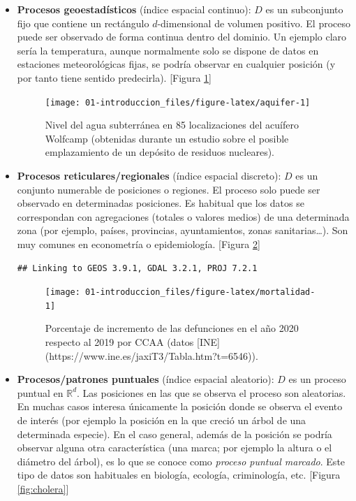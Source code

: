 \documentclass[
  spanish,
]{book}
\theoremstyle{break}
\theoremstyle{definition}
\theoremstyle{definition}
\theoremstyle{definition}
\theoremstyle{definition}
\theoremstyle{remark}
\begin{document}
\begin{itemize}
\item
  \textbf{Procesos geoestadísticos} (índice espacial continuo):
  \(D\) es un subconjunto fijo que contiene un rectángulo \(d\)-dimensional de volumen
  positivo. El proceso puede ser observado de forma continua dentro del dominio.
  Un ejemplo claro sería la temperatura, aunque normalmente solo se dispone de datos en
  estaciones meteorológicas fijas, se podría observar en cualquier posición
  (y por tanto tiene sentido predecirla). {[}Figura \ref{fig:aquifer}{]}

  \begin{figure}[!htb]

  {\centering \texttt{[image: 01-introduccion\_files/figure-latex/aquifer-1]} 

  }

  \caption{Nivel del agua subterránea en 85 localizaciones del acuífero Wolfcamp (obtenidas durante un estudio sobre el posible emplazamiento de un depósito de residuos nucleares).}\label{fig:aquifer}
  \end{figure}
\item
  \textbf{Procesos reticulares/regionales} (índice espacial discreto):
  \(D\) es un conjunto numerable de posiciones o regiones. El proceso solo puede ser
  observado en determinadas posiciones. Es habitual que los datos se correspondan
  con agregaciones (totales o valores medios) de una determinada zona (por ejemplo,
  países, provincias, ayuntamientos, zonas sanitarias\ldots). Son muy comunes en
  econometría o epidemiología. {[}Figura \ref{fig:mortalidad}{]}

\begin{verbatim}
## Linking to GEOS 3.9.1, GDAL 3.2.1, PROJ 7.2.1
\end{verbatim}

  \begin{figure}[!htb]

  {\centering \texttt{[image: 01-introduccion\_files/figure-latex/mortalidad-1]} 

  }

  \caption{Porcentaje de incremento de las defunciones en el año 2020 respecto al 2019 por CCAA (datos [INE](https://www.ine.es/jaxiT3/Tabla.htm?t=6546)).}\label{fig:mortalidad}
  \end{figure}
\item
  \textbf{Procesos/patrones puntuales} (índice espacial aleatorio):
  \(D\) es un proceso puntual en \(\mathbb{R}^{d}\). Las posiciones en las que se
  observa el proceso son aleatorias. En muchas casos interesa únicamente la posición
  donde se observa el evento de interés (por ejemplo la posición en la que creció
  un árbol de una determinada especie). En el caso general, además de la posición
  se podría observar alguna otra característica (una marca; por ejemplo la altura o
  el diámetro del árbol), es lo que se conoce como \emph{proceso puntual marcado}.
  Este tipo de datos son habituales en biología, ecología, criminología, etc.
  {[}Figura \ref{fig:cholera}{]}


\end{itemize}
\end{document}

